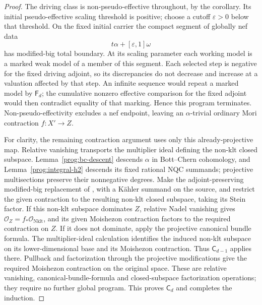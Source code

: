\begin{proof}
The driving class is non-pseudo-effective throughout, by the
corollary. Its initial pseudo-effective scaling threshold is positive;
choose a cutoff $\varepsilon>0$ below that threshold. On the fixed
initial carrier the compact segment of globally nef data
\[
                    t\alpha+[\varepsilon,1]\omega
\]
has modified-big total boundary. At its scaling parameter each working
model is a marked weak model of a member of this segment. Each selected
step is negative for the fixed driving adjoint, so its discrepancies
do not decrease and increase at a valuation affected by that step.
An infinite sequence would repeat a marked model by $\mathsf F_d$;
the cumulative nonzero effective comparison for the fixed adjoint
would then contradict equality of that marking. Hence this program
terminates. Non-pseudo-effectivity excludes a nef endpoint, leaving
an $\alpha$-trivial ordinary Mori contraction $f:X'\to Z$.

For clarity, the remaining contraction argument uses only this
already-projective map. Relative vanishing transports the multiplier
ideal defining the non-klt closed subspace. Lemma~\ref{prog:bc-descent}
descends $\alpha$ in Bott--Chern cohomology, and
Lemma~\ref{prog:integral-h2} descends its fixed rational NQC summands;
projective multisections preserve their nonnegative degrees.
Make the adjoint-preserving modified-big replacement of
\cite[Lemma~2.23 and Section~6]{HX}, with a K\"ahler summand on
the source, and restrict the given contraction to the resulting
non-klt closed subspace, taking its Stein factor. If this non-klt
subspace dominates $Z$, relative Nadel vanishing gives
$\mathcal O_Z=f_*\mathcal O_{\operatorname{Nklt}}$, and its given
Moishezon contraction factors to the required contraction on $Z$.
If it does not dominate, apply the projective canonical bundle formula. The multiplier-ideal calculation identifies the
induced non-klt subspace on its lower-dimensional base and its
Moishezon contraction. Thus $\mathsf C_{d-1}$ applies there.
Pullback and factorization through the projective modifications give
the required Moishezon contraction on the original space. These are
relative vanishing, canonical-bundle-formula and closed-subspace
factorization operations; they require no further global program.
This proves $\mathsf C_d$ and completes the induction.
\end{proof}

